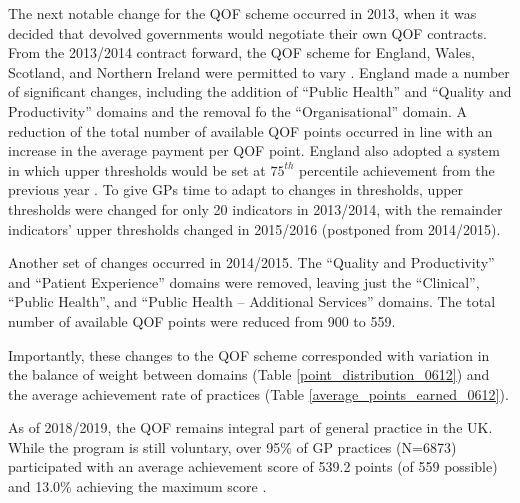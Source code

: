 \documentclass[12pt]{article}
\begin{document}
The next notable change for the QOF scheme occurred in 2013, when it was decided that devolved governments would negotiate their own QOF contracts. From the 2013/2014 contract forward, the QOF scheme for England, Wales, Scotland, and Northern Ireland were permitted to vary \citep{instituteofhealthcaremanagementFocusGPQuality2018}. England made a number of significant changes, including the addition of ``Public Health'' and ``Quality and Productivity'' domains and the removal fo the ``Organisational'' domain. A reduction of the total number of available QOF points occurred in line with an increase in the average payment per QOF point. England also adopted a system in which upper thresholds would be set at $75^{th}$ percentile achievement from the previous year \citep{doranSettingPerformanceTargets2014}. To give GPs time to adapt to changes in thresholds, upper thresholds were changed for only 20 indicators in 2013/2014, with the remainder indicators' upper thresholds changed in 2015/2016 (postponed from 2014/2015).

Another set of changes occurred in 2014/2015. The ``Quality and Productivity'' and ``Patient Experience'' domains were removed, leaving just the ``Clinical'', ``Public Health'', and ``Public Health -- Additional Services'' domains. The total number of available QOF points were reduced from 900 to 559.

Importantly, these changes to the QOF scheme corresponded with variation in the balance of weight between domains (Table \ref{point_distribution_0612}) and the average achievement rate of practices (Table \ref{average_points_earned_0612}).





As of 2018/2019, the QOF remains integral part of general practice in the UK. While the program is still voluntary, over 95\% of GP practices (N=6873) participated with an average achievement score of 539.2 points (of 559 possible) and 13.0\% achieving the maximum score \citep{nationalhealthserviceQualityOutcomesFramework2019}.


%
\end{document}
